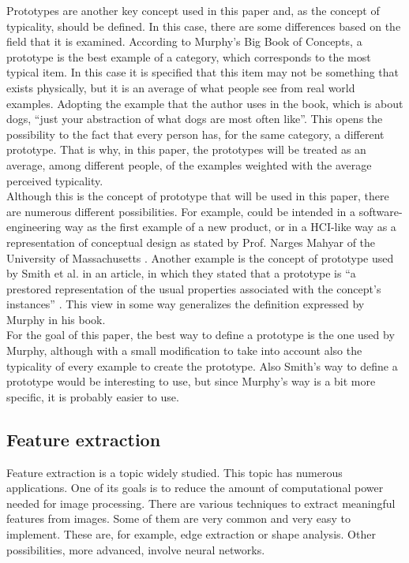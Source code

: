 \documentclass[conference]{IEEEtran}
\begin{document}
			\noindent Prototypes are another key concept used in this paper and, as the concept of typicality, should be defined. In this case, there are some differences based on the field that it is 
			examined. According to Murphy's Big Book of Concepts\cite{Murphy:2002}, a prototype is the best example of a category, which corresponds to the most typical item. In this case 
			it is specified that this item may not be something that exists physically, but it is an average of what people see from real world examples. Adopting the example that the 
			author uses in the book, which is about dogs, ``just your abstraction of what dogs are most often like''. This opens the possibility to the fact that every person has, for the 
			same category, a different prototype. That is why, in this paper, the prototypes will be treated as an average, among different people, of the examples weighted with the 
			average perceived typicality.\\
			Although this is the concept of prototype that will be used in this paper, there are numerous different possibilities. For example, could be intended in a software-engineering way 
			as the first example of a new product, or in a HCI-like way as a representation of conceptual design as stated by Prof. Narges Mahyar of the University of 
			Massachusetts \cite{hciprot}. Another example is the concept of prototype used by Smith et al. in an article, in which they stated that a prototype is ``a prestored representation 
			of the usual properties associated with the concept's instances'' \cite{smith1988combining}. This view in some way generalizes the definition expressed by Murphy in his book. \\
			For the goal of this paper, the best way to define a prototype is the one used by Murphy, although with a small modification to take into account also the typicality of every 
			example to create the prototype. Also Smith's way to define a prototype would be interesting to use, but since Murphy's way is a bit more specific, it is probably easier to use.

		\subsection{Feature extraction\label{sec:bfe}}

			\noindent Feature extraction is a topic widely studied. 
			This topic has numerous applications. 
			One of its goals is to reduce the amount of computational power needed for image processing. 
			There are various techniques to extract meaningful features from images. 
			Some of them are very common and very easy to implement. 
			These are, for example, edge extraction or shape analysis. 
			Other possibilities, more advanced, involve neural networks.\\
\end{document}
